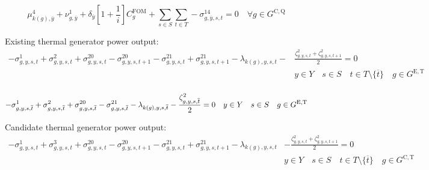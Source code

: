 \documentclass{article}
\newcommand{\sGeneratorsExistingThermal}{G^{\mathrm{E,T}}}
\newcommand{\sGeneratorsCandidateThermal}{G^{\mathrm{C,T}}}
\newcommand{\sStorageCandidate}{G^{\mathrm{C,Q}}}
\newcommand{\sYears}{Y}
\newcommand{\sScenarios}{S}
\newcommand{\sIntervals}{T}
\newcommand{\iGenerator}{g}
\newcommand{\iYear}{y}
\newcommand{\iYearTerminal}{\overline{\iYear}}
\newcommand{\iScenario}{s}
\newcommand{\iInterval}{t}
\newcommand{\iIntervalTerminal}{\overline{\iInterval}}
\newcommand{\iZone}{z}
\newcommand{\cFixedOperationsMaintenanceCostGenerator}[1][\iGenerator]{C^{\mathrm{FOM}}_{#1}}
\newcommand{\cInterestRate}{i}
\newcommand{\cDiscountRate}[1][\iYear]{\delta_{#1}}
\newcommand{\dStorageBuildLimit}[1][\iZone,\iYear]{\mu_{#1}^{4}}
\newcommand{\dTotalInstallCapacity}[1][\iGenerator,\iYear]{\nu_{#1}^{1}}
\newcommand{\dMinPowerOutput}[1][\iGenerator,\iYear,\iScenario,\iInterval]{\sigma_{#1}^{1}}
\newcommand{\dMaxPowerOutputExistingThermal}[1][\iGenerator,\iYear,\iScenario,\iInterval]{\sigma_{#1}^{2}}
\newcommand{\dMaxPowerOutputCandidateThermal}[1][\iGenerator,\iYear,\iScenario,\iInterval]{\sigma_{#1}^{3}}
\newcommand{\dMaxDischargingRateCandidate}[1][\iGenerator,\iYear,\iScenario,\iInterval]{\sigma_{#1}^{14}}
\newcommand{\dRampRateUp}[1][\iGenerator,\iYear,\iScenario,\iInterval]{\sigma_{#1}^{20}}
\newcommand{\dRampRateDown}[1][\iGenerator,\iYear,\iScenario,\iInterval]{\sigma_{#1}^{21}}
\newcommand{\dPowerBalance}[1][\iZone,\iYear,\iScenario,\iInterval]{\lambda_{#1}}
\newcommand{\dGeneratorEnergyOutput}[1][\iGenerator,\iYear,\iScenario,\iInterval]{\zeta_{#1}^{2}}
\begin{document}
\begin{equation}
\dStorageBuildLimit[k(\iGenerator),\iYearTerminal] + \dTotalInstallCapacity[\iGenerator,\iYearTerminal] + \cDiscountRate[\iYearTerminal] \left[1 + \frac{1}{\cInterestRate}\right] \cFixedOperationsMaintenanceCostGenerator + \sum\limits_{\iScenario \in \sScenarios}\sum\limits_{\iInterval \in \sIntervals} - \dMaxDischargingRateCandidate[\iGenerator,\iYearTerminal,\iScenario,\iInterval] = 0 \quad \forall \iGenerator \in \sStorageCandidate
\end{equation}

Existing thermal generator power output:
\begin{align}
-\dMinPowerOutput + \dMaxPowerOutputExistingThermal + \dRampRateUp - \dRampRateUp[\iGenerator,\iYear,\iScenario,\iInterval+1] - \dRampRateDown + \dRampRateDown[\iGenerator,\iYear,\iScenario,\iInterval+1] - \dPowerBalance[k(\iGenerator),\iYear,\iScenario,\iInterval] - & \frac{\dGeneratorEnergyOutput + \dGeneratorEnergyOutput[\iGenerator,\iYear,\iScenario,\iInterval+1]}{2} = 0\\\nonumber
& \iYear \in \sYears \quad \iScenario \in \sScenarios \quad \iInterval \in \sIntervals \setminus \{\iIntervalTerminal\} \quad \iGenerator \in \sGeneratorsExistingThermal\\\nonumber
\end{align}

\begin{equation}
-\dMinPowerOutput[\iGenerator,\iYear,\iScenario,\iIntervalTerminal] + \dMaxPowerOutputExistingThermal[\iGenerator,\iYear,\iScenario,\iIntervalTerminal] + \dRampRateUp[\iGenerator,\iYear,\iScenario,\iIntervalTerminal] - \dRampRateDown[\iGenerator,\iYear,\iScenario,\iIntervalTerminal] - \dPowerBalance[k(\iGenerator),\iYear,\iScenario,\iIntervalTerminal] - \frac{\dGeneratorEnergyOutput[\iGenerator,\iYear,\iScenario,\iIntervalTerminal]}{2} = 0 \quad \iYear \in \sYears \quad \iScenario \in \sScenarios \quad \iGenerator \in \sGeneratorsExistingThermal\\
\end{equation}

Candidate thermal generator power output:
\begin{align}
-\dMinPowerOutput + \dMaxPowerOutputCandidateThermal + \dRampRateUp - \dRampRateUp[\iGenerator,\iYear,\iScenario,\iInterval+1] - \dRampRateDown + \dRampRateDown[\iGenerator,\iYear,\iScenario,\iInterval+1] - \dPowerBalance[k(\iGenerator),\iYear,\iScenario,\iInterval] & - \frac{\dGeneratorEnergyOutput + \dGeneratorEnergyOutput[\iGenerator,\iYear,\iScenario,\iInterval+1]}{2} = 0\\\nonumber
& \iYear \in \sYears \quad \iScenario \in \sScenarios \quad \iInterval \in \sIntervals \setminus \{\iIntervalTerminal\} \quad \iGenerator \in \sGeneratorsCandidateThermal\\\nonumber
\end{align}
\end{document}
